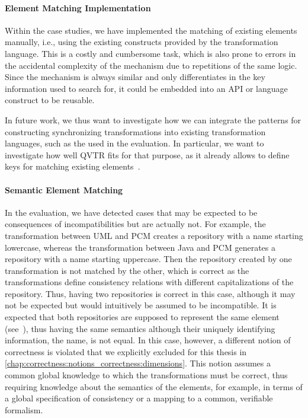 \paragraph{Element Matching Implementation}
Within the case studies, we have implemented the matching of existing elements manually, i.e., using the existing constructs provided by the transformation language.
This is a costly and cumbersome task, which is also prone to errors in the accidental complexity of the mechanism due to repetitions of the same logic.
Since the mechanism is always similar and only differentiates in the key information used to search for, it could be embedded into an \gls{API} or language construct to be reusable.

In future work, we thus want to investigate how we can integrate the patterns for constructing synchronizing transformations into existing transformation languages, such as the \reactionslanguage used in the evaluation.
In particular, we want to investigate how well \gls{QVTR} fits for that purpose, as it already allows to define keys for matching existing elements~\cite[Sec.~7.10.2.]{qvt}.

\paragraph{Semantic Element Matching}
In the evaluation, we have detected cases that may be expected to be consequences of incompatibilities but are actually not.
For example, the transformation between \gls{UML} and \gls{PCM} creates a repository with a name starting lowercase, whereas the transformation between Java and \gls{PCM} generates a repository with a name starting uppercase.
Then the repository created by one transformation is not matched by the other, which is correct as the transformations define consistency relations with different capitalizations of the repository.
Thus, having two repositories is correct in this case, although it may not be expected but would intuitively be assumed to be incompatible.
It is expected that both repositories are supposed to represent the same element (see~), thus having the same semantics although their uniquely identifying information, the name, is not equal.
In this case, however, a different notion of correctness is violated that we explicitly excluded for this thesis in \autoref{chap:correctness:notions_correctness:dimensions}.
This notion assumes a common global knowledge to which the transformations must be correct, thus requiring knowledge about the semantics of the elements, for example, in terms of a global specification of consistency or a mapping to a common, verifiable formalism.

